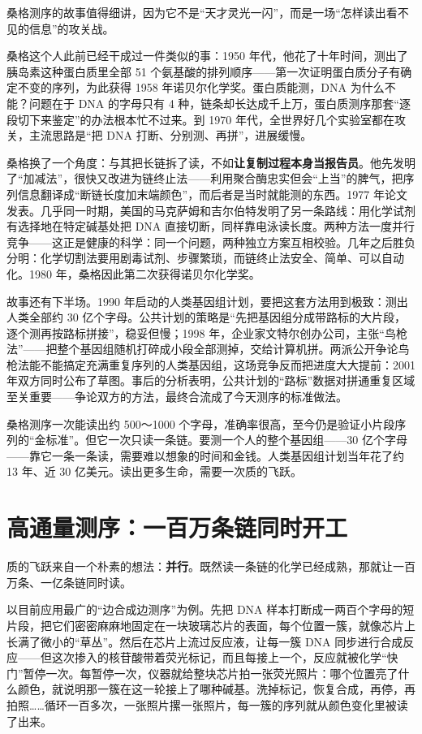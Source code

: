 \begin{zhengju}
桑格测序的故事值得细讲，因为它不是“天才灵光一闪”，而是一场“怎样读出看不见的信息”的攻关战。

桑格这个人此前已经干成过一件类似的事：1950 年代，他花了十年时间，测出了胰岛素这种蛋白质里全部 51 个氨基酸的排列顺序——第一次证明蛋白质分子有确定不变的序列，为此获得 1958 年诺贝尔化学奖。蛋白质能测，DNA 为什么不能？问题在于 DNA 的字母只有 4 种，链条却长达成千上万，蛋白质测序那套“逐段切下来鉴定”的办法根本忙不过来。到 1970 年代，全世界好几个实验室都在攻关，主流思路是“把 DNA 打断、分别测、再拼”，进展缓慢。

桑格换了一个角度：与其把长链拆了读，不如\textbf{让复制过程本身当报告员}。他先发明了“加减法”，很快又改进为链终止法——利用聚合酶忠实但会“上当”的脾气，把序列信息翻译成“断链长度加末端颜色”，而后者是当时就能测的东西。1977 年论文发表。几乎同一时期，美国的马克萨姆和吉尔伯特发明了另一条路线：用化学试剂有选择地在特定碱基处把 DNA 直接切断，同样靠电泳读长度。两种方法一度并行竞争——这正是健康的科学：同一个问题，两种独立方案互相校验。几年之后胜负分明：化学切割法要用剧毒试剂、步骤繁琐，而链终止法安全、简单、可以自动化。1980 年，桑格因此第二次获得诺贝尔化学奖。

故事还有下半场。1990 年启动的人类基因组计划，要把这套方法用到极致：测出人类全部约 30 亿个字母。公共计划的策略是“先把基因组分成带路标的大片段，逐个测再按路标拼接”，稳妥但慢；1998 年，企业家文特尔创办公司，主张“鸟枪法”——把整个基因组随机打碎成小段全部测掉，交给计算机拼。两派公开争论鸟枪法能不能搞定充满重复序列的人类基因组，这场竞争反而把进度大大提前：2001 年双方同时公布了草图。事后的分析表明，公共计划的“路标”数据对拼通重复区域至关重要——争论双方的方法，最终合流成了今天测序的标准做法。
\end{zhengju}

桑格测序一次能读出约 500～1000 个字母，准确率很高，至今仍是验证小片段序列的“金标准”。但它一次只读一条链。要测一个人的整个基因组——30 亿个字母——靠它一条一条读，需要难以想象的时间和金钱。人类基因组计划当年花了约 13 年、近 30 亿美元。读出更多生命，需要一次质的飞跃。

\section{高通量测序：一百万条链同时开工}

质的飞跃来自一个朴素的想法：\textbf{并行}。既然读一条链的化学已经成熟，那就让一百万条、一亿条链同时读。

以目前应用最广的“边合成边测序”为例。先把 DNA 样本打断成一两百个字母的短片段，把它们密密麻麻地固定在一块玻璃芯片的表面，每个位置一簇，就像芯片上长满了微小的“草丛”。然后在芯片上流过反应液，让每一簇 DNA 同步进行合成反应——但这次掺入的核苷酸带着荧光标记，而且每接上一个，反应就被化学“快门”暂停一次。每暂停一次，仪器就给整块芯片拍一张荧光照片：哪个位置亮了什么颜色，就说明那一簇在这一轮接上了哪种碱基。洗掉标记，恢复合成，再停，再拍照……循环一百多次，一张照片摞一张照片，每一簇的序列就从颜色变化里被读了出来。

